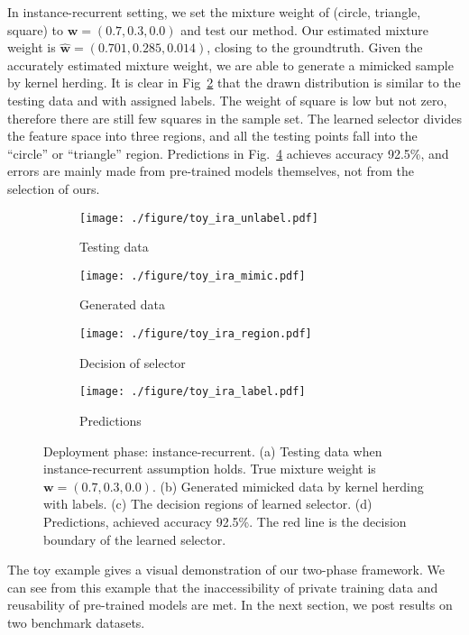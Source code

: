 \documentclass[paper=letter, fontsize=20pt]{article}
\begin{document}
In instance-recurrent setting, we set the mixture weight of (circle, triangle, square) to $\bm{w}=(0.7,0.3,0.0)$ and test our method. Our estimated mixture weight is $\widehat{\bm{w}}=(0.701,0.285,0.014)$, closing to the groundtruth. Given the accurately estimated mixture weight, we are able to generate a mimicked sample by kernel herding. It is clear in Fig~\ref{fig:toy_ira_mimic} that the drawn distribution is similar to the testing data and with assigned labels. The weight of square is low but not zero, therefore there are still few squares in the sample set. The learned selector divides the feature space into three regions, and all the testing points fall into the  ``circle'' or ``triangle'' region. Predictions in Fig.~\ref{fig:toy_ira_label} achieves accuracy 92.5\%, and errors are mainly made from pre-trained models themselves, not from the selection of ours.
\begin{figure}[!htb]
\centering
\begin{subfigure}[b]{0.23\textwidth}
\captionsetup{skip=1pt}
\texttt{[image: ./figure/toy\_ira\_unlabel.pdf]}
\caption{Testing data}\label{fig:toy_ira_unlabel}
\end{subfigure}
\begin{subfigure}[b]{0.23\textwidth}
\captionsetup{skip=1pt}
\texttt{[image: ./figure/toy\_ira\_mimic.pdf]}
\caption{Generated data}\label{fig:toy_ira_mimic}
\end{subfigure}
\begin{subfigure}[b]{0.229\textwidth}
\captionsetup{skip=1pt}
\texttt{[image: ./figure/toy\_ira\_region.pdf]}
\caption{Decision of selector}\label{fig:toy_ira_region}
\end{subfigure}
\begin{subfigure}[b]{0.23\textwidth}
\captionsetup{skip=1pt}
\texttt{[image: ./figure/toy\_ira\_label.pdf]}
\caption{Predictions}\label{fig:toy_ira_label}
\end{subfigure}
 \caption{Deployment phase: instance-recurrent. (a) Testing data when instance-recurrent assumption holds. True mixture weight is $\bm{w}=(0.7,0.3,0.0)$. (b) Generated mimicked data by kernel herding with labels. (c) The decision regions of learned selector. (d) Predictions, achieved accuracy 92.5\%. The red line is the decision boundary of the learned selector.}\label{fig:deployment_ira}
\end{figure}

The toy example gives a visual demonstration of our two-phase framework. We can see from this example that the inaccessibility of private training data and reusability of pre-trained models are met. In the next section, we post results on two benchmark datasets.
\end{document}
